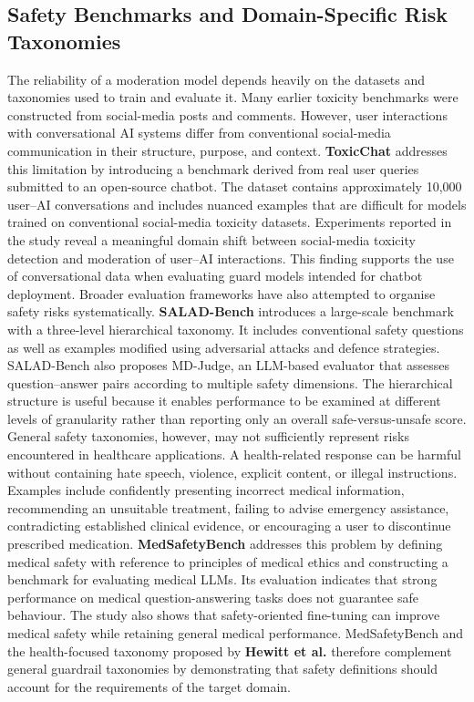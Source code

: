 \documentclass[11pt,a4paper]{article}
\begin{document}
\subsection{Safety Benchmarks and Domain-Specific Risk Taxonomies}
The reliability of a moderation model depends heavily on the datasets and taxonomies used to train and evaluate it. Many earlier toxicity benchmarks were constructed from social-media posts and comments. However, user interactions with conversational AI systems differ from conventional social-media communication in their structure, purpose, and context.
\textbf{ToxicChat} \cite{lin2023toxicchat} addresses this limitation by introducing a benchmark derived from real user queries submitted to an open-source chatbot. The dataset contains approximately 10,000 user–AI conversations and includes nuanced examples that are difficult for models trained on conventional social-media toxicity datasets. Experiments reported in the study reveal a meaningful domain shift between social-media toxicity detection and moderation of user–AI interactions. This finding supports the use of conversational data when evaluating guard models intended for chatbot deployment.
Broader evaluation frameworks have also attempted to organise safety risks systematically. \textbf{SALAD-Bench} \cite{li2024saladbench} introduces a large-scale benchmark with a three-level hierarchical taxonomy. It includes conventional safety questions as well as examples modified using adversarial attacks and defence strategies. SALAD-Bench also proposes MD-Judge, an LLM-based evaluator that assesses question–answer pairs according to multiple safety dimensions. The hierarchical structure is useful because it enables performance to be examined at different levels of granularity rather than reporting only an overall safe-versus-unsafe score.
General safety taxonomies, however, may not sufficiently represent risks encountered in healthcare applications. A health-related response can be harmful without containing hate speech, violence, explicit content, or illegal instructions. Examples include confidently presenting incorrect medical information, recommending an unsuitable treatment, failing to advise emergency assistance, contradicting established clinical evidence, or encouraging a user to discontinue prescribed medication.
\textbf{MedSafetyBench} \cite{han2024medsafetybench} addresses this problem by defining medical safety with reference to principles of medical ethics and constructing a benchmark for evaluating medical LLMs. Its evaluation indicates that strong performance on medical question-answering tasks does not guarantee safe behaviour. The study also shows that safety-oriented fine-tuning can improve medical safety while retaining general medical performance. MedSafetyBench and the health-focused taxonomy proposed by \textbf{Hewitt et al.} \cite{hewitt2025health} therefore complement general guardrail taxonomies by demonstrating that safety definitions should account for the requirements of the target domain.
\end{document}
